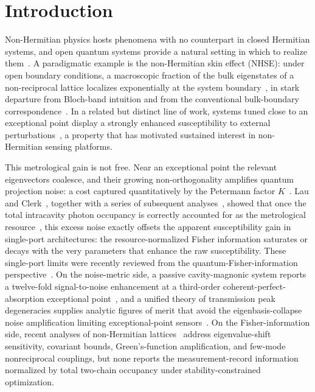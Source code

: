 \documentclass[aps,prxquantum,preprint,superscriptaddress,amsmath,amssymb]{revtex4-2}
\begin{document}
\maketitle

\section{Introduction}
\label{sec:intro}

Non-Hermitian physics hosts phenomena with no counterpart in closed Hermitian systems, and open quantum systems provide a natural setting in which to realize them~\citep{Yao2018,Bergholtz2021,ElGanainy2018,Ashida2020,Feng2017,Rotter2017}. A paradigmatic example is the non-Hermitian skin effect (NHSE): under open boundary conditions, a macroscopic fraction of the bulk eigenstates of a non-reciprocal lattice localizes exponentially at the system boundary~\citep{Yao2018,Schomerus2020,Weidemann2020,Helbig2020,GhatakDas2019}, in stark departure from Bloch-band intuition and from the conventional bulk-boundary correspondence~\citep{Peano2015,Kunst2018}. In a related but distinct line of work, systems tuned close to an exceptional point display a strongly enhanced susceptibility to external perturbations~\citep{Hodaei2017,Wiersig2020,Ozdemir2019,MiriAlu2019,Langbein2018}, a property that has motivated sustained interest in non-Hermitian sensing platforms.

This metrological gain is not free. Near an exceptional point the relevant eigenvectors coalesce, and their growing non-orthogonality amplifies quantum projection noise: a cost captured quantitatively by the Petermann factor $K$~\citep{Zhang2019}. Lau and Clerk~\citep{Lau2018}, together with a series of subsequent analyses~\citep{Duggan2022,McDonald2020,McDonald2020Exponential,Bao2021,Ding2023}, showed that once the total intracavity photon occupancy is correctly accounted for as the metrological resource~\citep{Braunstein1994,Giovannetti2011,Demkowicz2012}, this excess noise exactly offsets the apparent susceptibility gain in single-port architectures: the resource-normalized Fisher information saturates or decays with the very parameters that enhance the raw susceptibility. These single-port limits were recently reviewed from the quantum-Fisher-information perspective~\citep{Wiersig2026}. On the noise-metric side, a passive cavity-magnonic system reports a twelve-fold signal-to-noise enhancement at a third-order coherent-perfect-absorption exceptional point~\citep{Wang2026}, and a unified theory of transmission peak degeneracies supplies analytic figures of merit that avoid the eigenbasis-collapse noise amplification limiting exceptional-point sensors~\citep{Carney2026}. On the Fisher-information side, recent analyses of non-Hermitian lattices~\citep{LiGuo2026,Wu2026CQFI,Liang2026,XieXu2024} address eigenvalue-shift sensitivity, covariant bounds, Green's-function amplification, and few-mode nonreciprocal couplings, but none reports the measurement-record information normalized by total two-chain occupancy under stability-constrained optimization.
\end{document}
